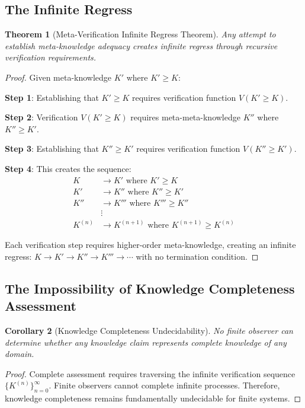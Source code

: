\documentclass[12pt,a4paper]{article}
\newtheorem{theorem}{Theorem}[section]
\newtheorem{corollary}[theorem]{Corollary}
\begin{document}
\subsection{The Infinite Regress}

\begin{theorem}[Meta-Verification Infinite Regress Theorem]
Any attempt to establish meta-knowledge adequacy creates infinite regress through recursive verification requirements.
\end{theorem}

\begin{proof}
Given meta-knowledge $K'$ where $K' \geq K$:

\textbf{Step 1}: Establishing that $K' \geq K$ requires verification function $V(K' \geq K)$.

\textbf{Step 2}: Verification $V(K' \geq K)$ requires meta-meta-knowledge $K''$ where $K'' \geq K'$.

\textbf{Step 3}: Establishing that $K'' \geq K'$ requires verification function $V(K'' \geq K')$.

\textbf{Step 4}: This creates the sequence:
\begin{align}
K &\rightarrow K' \text{ where } K' \geq K \\
K' &\rightarrow K'' \text{ where } K'' \geq K' \\
K'' &\rightarrow K''' \text{ where } K''' \geq K'' \\
&\vdots \\
K^{(n)} &\rightarrow K^{(n+1)} \text{ where } K^{(n+1)} \geq K^{(n)}
\end{align}

Each verification step requires higher-order meta-knowledge, creating an infinite regress: $K \rightarrow K' \rightarrow K'' \rightarrow K''' \rightarrow \cdots$ with no termination condition.
\end{proof}

\subsection{The Impossibility of Knowledge Completeness Assessment}

\begin{corollary}[Knowledge Completeness Undecidability]
No finite observer can determine whether any knowledge claim represents complete knowledge of any domain.
\end{corollary}

\begin{proof}
Complete assessment requires traversing the infinite verification sequence $\{K^{(n)}\}_{n=0}^{\infty}$. Finite observers cannot complete infinite processes. Therefore, knowledge completeness remains fundamentally undecidable for finite systems.
\end{proof}
\end{document}
